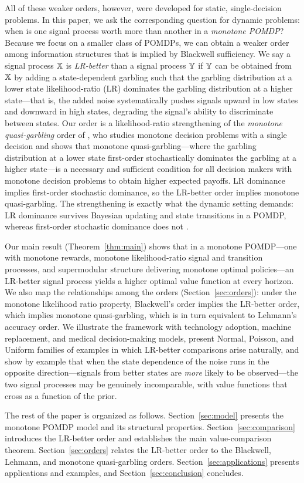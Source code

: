 All of these weaker orders, however, were developed for static,
single-decision problems. In this paper, we ask the corresponding
question for dynamic problems: when is one signal process worth more
than another in a \emph{monotone POMDP}? Because we focus on a smaller
class of POMDPs, we can obtain a weaker order among information
structures that is implied by Blackwell sufficiency. We say a signal
process ${\mathbb{X}}$ is \emph{LR-better} than a signal process ${\mathbb{Y}}$ if ${\mathbb{Y}}$
can be obtained from ${\mathbb{X}}$ by adding a state-dependent garbling such
that the garbling distribution at a lower state likelihood-ratio (LR)
dominates the garbling distribution at a higher state---that is, the
added noise systematically pushes signals upward in low states and
downward in high states, degrading the signal's ability to
discriminate between states. Our order is a likelihood-ratio
strengthening of the \emph{monotone quasi-garbling} order of
\citet{kim2023comparing}, who studies monotone decision problems with
a single decision and shows that monotone quasi-garbling---where the
garbling distribution at a lower state first-order stochastically
dominates the garbling at a higher state---is a necessary and
sufficient condition for all decision makers with monotone decision
problems to obtain higher expected payoffs. LR dominance implies
first-order stochastic dominance, so the LR-better order implies
monotone quasi-garbling. The strengthening is exactly what the dynamic
setting demands: LR dominance survives Bayesian updating and state
transitions in a POMDP, whereas first-order stochastic dominance does
not \citep[see][for a discussion]{ulu2009uncertainty}.

Our main result (Theorem~\ref{thm:main}) shows that in a monotone
POMDP---one with monotone rewards, monotone likelihood-ratio signal
and transition processes, and supermodular structure delivering
monotone optimal policies---an LR-better signal process yields a
higher optimal value function at every horizon. We also map the
relationships among the orders (Section~\ref{sec:orders}): under the
monotone likelihood ratio property, Blackwell's order implies the
LR-better order, which implies monotone quasi-garbling, which is in
turn equivalent to Lehmann's accuracy order. We illustrate the
framework with technology adoption, machine replacement, and medical
decision-making models, present Normal, Poisson, and Uniform families
of examples in which LR-better comparisons arise naturally, and show
by example that when the state dependence of the noise runs in the
opposite direction---signals from better states are \emph{more} likely
to be observed---the two signal processes may be genuinely
incomparable, with value functions that cross as a function of the
prior.

The rest of the paper is organized as follows.
Section~\ref{sec:model} presents the monotone POMDP model and its
structural properties. Section~\ref{sec:comparison} introduces the
LR-better order and establishes the main value-comparison theorem.
Section~\ref{sec:orders} relates the LR-better order to the Blackwell,
Lehmann, and monotone quasi-garbling orders.
Section~\ref{sec:applications} presents applications and examples,
and Section~\ref{sec:conclusion} concludes.
